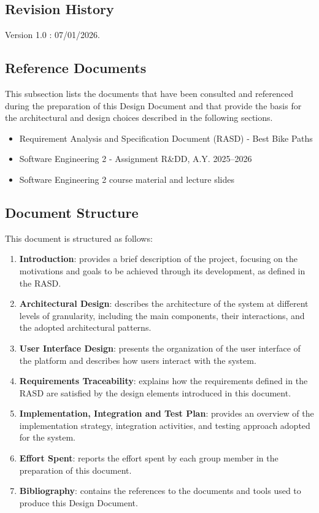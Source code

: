 \subsection{Revision History}

Version 1.0 : 07/01/2026.

\subsection{Reference Documents}

This subsection lists the documents that have been consulted and referenced during the preparation of this Design Document and that provide the basis for the architectural and design choices described in the following sections.

\begin{itemize}
    \item Requirement Analysis and Specification Document (RASD) - Best Bike Paths
    \item Software Engineering 2 - Assignment R\&DD, A.Y. 2025--2026
    \item Software Engineering 2 course material and lecture slides
\end{itemize}

\subsection{Document Structure}

This document is structured as follows:

\begin{enumerate}
    \item \textbf{Introduction}: provides a brief description of the project, focusing on the motivations and goals to be achieved through its development, as defined in the RASD.
    \item \textbf{Architectural Design}: describes the architecture of the system at different levels of granularity, including the main components, their interactions, and the adopted architectural patterns.
    \item \textbf{User Interface Design}: presents the organization of the user interface of the platform and describes how users interact with the system.
    \item \textbf{Requirements Traceability}: explains how the requirements defined in the RASD are satisfied by the design elements introduced in this document.
    \item \textbf{Implementation, Integration and Test Plan}: provides an overview of the implementation strategy, integration activities, and testing approach adopted for the system.
    \item \textbf{Effort Spent}: reports the effort spent by each group member in the preparation of this document.
    \item \textbf{Bibliography}: contains the references to the documents and tools used to produce this Design Document.
\end{enumerate}

